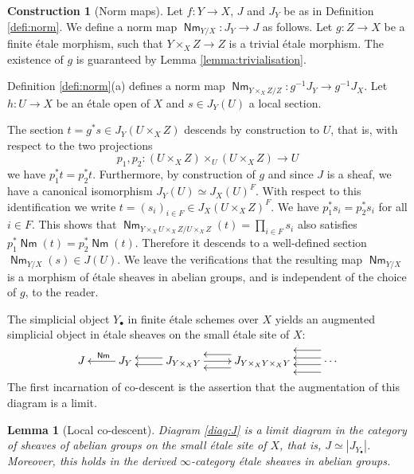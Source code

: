 \documentclass{article}
\DeclareMathOperator{\Nm}{\mathsf{Nm}}
\theoremstyle{definition}
\newtheorem{construction}[definition]{Construction}
\theoremstyle{plain}
\newtheorem{lemma}[definition]{Lemma}
\begin{document}
\begin{construction}[Norm maps]
Let $f\colon Y \to X$, $J$ and $J_Y$ be as in Definition \ref{defi:norm}. We define a norm map $\Nm_{Y/X} \colon J_Y \to J$ as follows. Let $g\colon Z \to X$ be a finite \'etale morphism, such that $Y \times_X Z \to Z$ is a trivial \'etale morphism. The existence of $g$ is guaranteed by Lemma \ref{lemma:trivialisation}.

Definition \ref{defi:norm}(a) defines a norm map $\Nm_{Y \times_X Z/Z}\colon g^{-1} J_Y \to g^{-1}J_X$. Let $h\colon U \to X$ be an \'etale open of $X$ and $s \in J_Y(U)$ a local section.

The section $t=g^*s \in J_Y(U \times_X Z)$ descends by construction to $U$, that is, with respect to the two projections 
$$p_1,p_2\colon(U \times_X Z) \times_U (U \times_X Z) \to U$$
we have $p_1^* t = p_2^* t$. Furthermore, by construction of $g$ and since $J$ is a sheaf, we have a canonical isomorphism $J_Y(U) \simeq J_X(U)^F$. With respect to this identification we write $t=(s_i)_{i \in F} \in J_X(U \times_X Z)^F$. We have $p_1^* s_i = p_2^* s_i$ for all $i \in F$. This shows that $\Nm_{Y \times_X U \times_X Z/U \times_X Z}(t) = \prod_{i \in F} s_i$ also satisfies $p_1^*\Nm(t) = p_2^*\Nm(t)$. Therefore it descends to a well-defined section $\Nm_{Y/X}(s) \in J(U)$. 
We leave the verifications that the resulting map $\Nm_{Y/X}$ is a morphism of \'etale sheaves in abelian groups, and is independent of the choice of $g$, to the reader.
\end{construction}

The simplicial object $Y_{\bullet}$ in finite \'etale schemes over $X$ yields an augmented simplicial object in \'etale sheaves on the small \'etale site of $X$:
\begin{equation}\label{diag:J}
\xymatrix{
J \ar@{<-}[r]^{\Nm} & J_Y \ar@{<-}@<-0.7ex>[r] \ar@{<-}@<0.7ex>[r] & J_{Y\times_X Y} \ar@{<-}@<-1.4ex>[r] \ar[r] \ar@{<-}@<1.4ex>[r] & J_{Y \times_X Y \times_X Y} \ar@{<-}@{<-}@<-0.7ex>[r] \ar@{<-}@{<-}@<0.7ex>[r]  \ar@{<-}@<-2.3ex>[r] \ar@{<-}@<2.3ex>[r] & \cdots 
}
\end{equation}
The first incarnation of co-descent is the assertion that the augmentation of this diagram is a limit.

\begin{lemma}[Local co-descent]\label{lemma:co-descent}
Diagram \eqref{diag:J} is a limit diagram in the category of sheaves of abelian groups on the small \'etale site of $X$, that is, $J \simeq |J_{Y_{\bullet}}|$. Moreover, this holds in the derived $\infty$-category \'etale sheaves in abelian groups.
\end{lemma}
\end{document}
